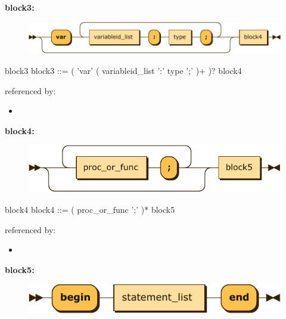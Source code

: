\documentclass[10pt,a4paper,twoside]{article}
\providecommand{\tightlist}{%
  \setlength{\itemsep}{0pt}\setlength{\parskip}{0pt}}
\newcounter{grammarbox}[section]
\begin{document}
\textbf{block3:}

\begin{figure}[H]
\centering
\includegraphics{diagram/block3.pdf}

\end{figure}

\begin{grammarbox}{block3}
\vspace{0.5em}
block3   ::= ( 'var' ( variableid\_list ':' type ';' )+ )? block4
\end{grammarbox}

referenced by:

\begin{itemize}
\tightlist
\item
\end{itemize}

\textbf{block4:}

\begin{figure}[H]
\centering
\includegraphics{diagram/block4.pdf}

\end{figure}

\begin{grammarbox}{block4}
\vspace{0.5em}
block4   ::= ( proc\_or\_func ';' )* block5
\end{grammarbox}

referenced by:

\begin{itemize}
\tightlist
\item
\end{itemize}

\textbf{block5:}

\begin{figure}[H]
\centering
\includegraphics{diagram/block5.pdf}

\end{figure}
\end{document}
